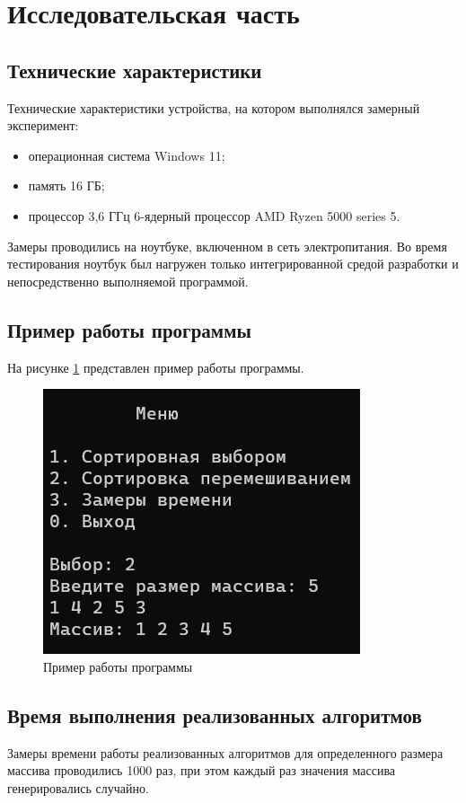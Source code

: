 \section{Исследовательская часть}

\subsection{Технические характеристики}

Технические характеристики устройства, на котором выполнялся замерный эксперимент:
\begin{itemize}[label*=---]
	\item операционная система Windows 11;
	\item память 16 ГБ;
	\item процессор 3,6 ГГц 6-ядерный процессор AMD Ryzen 5000 series 5.
\end{itemize}

Замеры проводились на ноутбуке, включенном в сеть электропитания. 
Во время тестирования ноутбук был нагружен только интегрированной средой разработки и непосредственно выполняемой программой.

\subsection{Пример работы программы}

На рисунке \ref{fig:example} представлен пример работы программы. 

\begin{figure}
	\centering
	\includegraphics[width=0.4\linewidth]{images/example}
	\caption{Пример работы программы}
	\label{fig:example}
\end{figure}

\newpage

\subsection{Время выполнения реализованных алгоритмов}
Замеры времени работы реализованных алгоритмов для определенного размера массива проводились 1000 раз, при этом каждый раз значения массива генерировались случайно.

